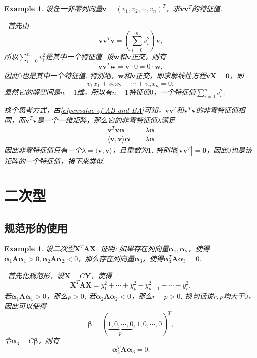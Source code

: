 \documentclass{article}
\newtheorem{example}[theorem]{Example}
\newcommand{\hints}{{\color{blue} \text{hints}}}
\newcommand{\mbf}[1]{\bm{#1}}
\newcommand\inp[2]{\langle #1, #2 \rangle} %
\begin{document}
\begin{example}
\rm 设任一非零列向量$\mbf{v}=(v_1,v_2,\cdots,v_n)^T$，求$\mbf{v}\mbf{v}^T$的特征值.

\hints\ 首先由
$$
\mbf{v}\mbf{v}^T\mbf{v} = \left(\sum\limits_{i = 0}^{n}v_i^2 \right)\mbf{v},
$$
所以$\sum\limits_{i = 0}^{n}v_i^2$是其中一个特征值. 设$\mbf{w}$和$\mbf{v}$正交，则有
$$
\mbf{v}\mbf{v}^T\mbf{w} = \mbf{v} \cdot 0 = 0 \cdot \mbf{w}, 
$$
因此$0$也是其中一个特征值. 特别地，$\mbf{w}$和$\mbf{v}$正交，即求解线性方程$\mbf{v}\mbf{X} = \mbf{0}$，即
$$
v_1 x_1 + v_2 x_2 + \cdots + v_n x_n = 0, 
$$
显然它的解空间是$n-1$维，所以有$n-1$特征值$0$，一个特征值$\sum\limits_{i = 0}^{n}v_i^2$. 

换个思考方式，由\ref{eigenvalue-of-AB-and-BA}可知，$\mbf{v}\mbf{v}^T$和$\mbf{v}^T\mbf{v}$的非零特征值相同，而$\mbf{v}^T\mbf{v}$是一个一维矩阵，那么它的非零特征值$\lambda$满足
$$
\begin{array}{ll}
\mbf{v}^T\mbf{v}\mbf{\alpha} &= \lambda \mbf{\alpha} \\
\inp{\mbf{v}}{\mbf{v}} \mbf{\alpha} & = \lambda \mbf{\alpha}
\end{array} 
$$
因此非零特征值只有一个$\lambda = \inp{\mbf{v}}{\mbf{v}}$，且重数为$1$. 特别地$|\mbf{v}\mbf{v}^T| = \mbf{0}$，因此$0$也是该矩阵的一个特征值，接下来类似. 
\end{example}

\newpage
\section{二次型}

\subsection{规范形的使用}

\begin{example}
\rm 设二次型$\mbf{X}^T\mbf{A}\mbf{X}$. 证明: 如果存在列向量$\mbf{\alpha}_1,\mbf{\alpha}_2$，使得$\mbf{\alpha}_1\mbf{A}\mbf{\alpha}_1 >0, \mbf{\alpha}_2\mbf{A}\mbf{\alpha}_2 < 0$，那么存在列向量$\mbf{\alpha}_3$，使得$\mbf{\alpha}_3^T\mbf{A}\mbf{\alpha}_3 = 0$.

\hints\ 首先化规范形，设$\mbf{X}=C\mbf{Y}$，使得
$$
\mbf{X}^T\mbf{A}\mbf{X} = y_1^2 + \cdots + y_p^2-y_{p+1}^2 - \cdots - y_r^2,
$$
若$\mbf{\alpha}_1\mbf{A}\mbf{\alpha}_1 >0$，那么$p > 0$; 若$\mbf{\alpha}_2\mbf{A}\mbf{\alpha}_2 < 0$，那么$r-p > 0$. 换句话说$r,p$均大于$0$，因此可以使得
$$
\mbf{\beta} =(\underbrace{1,0,\cdots,0}_{p},1,0,\cdots,0)^T,
$$
令$\mbf{\alpha}_3 = C\mbf{\beta}$，则有
$$
\mbf{\alpha}_3^T\mbf{A}\mbf{\alpha}_3 = 0. 
$$
\end{example}
\end{document}
